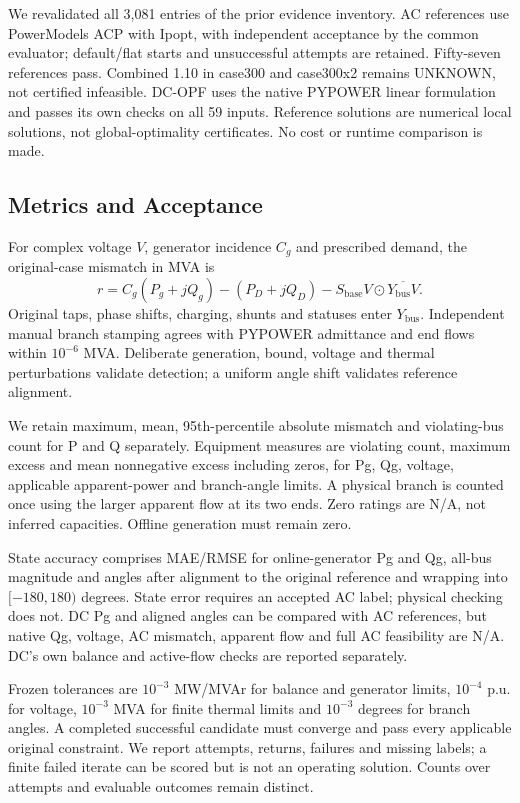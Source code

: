 \documentclass[conference,letterpaper]{IEEEtran}
\begin{document}
We revalidated all 3,081 entries of the prior evidence inventory. AC references use PowerModels ACP with Ipopt, with independent acceptance by the common evaluator; default/flat starts and unsuccessful attempts are retained. Fifty-seven references pass. Combined 1.10 in case300 and case300x2 remains UNKNOWN, not certified infeasible. DC-OPF uses the native PYPOWER linear formulation and passes its own checks on all 59 inputs. Reference solutions are numerical local solutions, not global-optimality certificates. No cost or runtime comparison is made.

\subsection{Metrics and Acceptance}
For complex voltage $V$, generator incidence $C_g$ and prescribed demand, the original-case mismatch in MVA is
\begin{equation}
r=C_g(P_g+jQ_g)-(P_D+jQ_D)-S_{\mathrm{base}}V\odot\overline{Y_{\mathrm{bus}}V}.
\label{eq:balance}
\end{equation}
Original taps, phase shifts, charging, shunts and statuses enter $Y_{\mathrm{bus}}$. Independent manual branch stamping agrees with PYPOWER admittance and end flows within $10^{-6}$ MVA. Deliberate generation, bound, voltage and thermal perturbations validate detection; a uniform angle shift validates reference alignment.

We retain maximum, mean, 95th-percentile absolute mismatch and violating-bus count for P and Q separately. Equipment measures are violating count, maximum excess and mean nonnegative excess including zeros, for Pg, Qg, voltage, applicable apparent-power and branch-angle limits. A physical branch is counted once using the larger apparent flow at its two ends. Zero ratings are N/A, not inferred capacities. Offline generation must remain zero.

State accuracy comprises MAE/RMSE for online-generator Pg and Qg, all-bus magnitude and angles after alignment to the original reference and wrapping into $[-180,180)$ degrees. State error requires an accepted AC label; physical checking does not. DC Pg and aligned angles can be compared with AC references, but native Qg, voltage, AC mismatch, apparent flow and full AC feasibility are N/A. DC's own balance and active-flow checks are reported separately.

Frozen tolerances are $10^{-3}$ MW/MVAr for balance and generator limits, $10^{-4}$ p.u. for voltage, $10^{-3}$ MVA for finite thermal limits and $10^{-3}$ degrees for branch angles. A completed successful candidate must converge and pass every applicable original constraint. We report attempts, returns, failures and missing labels; a finite failed iterate can be scored but is not an operating solution. Counts over attempts and evaluable outcomes remain distinct.
\end{document}
